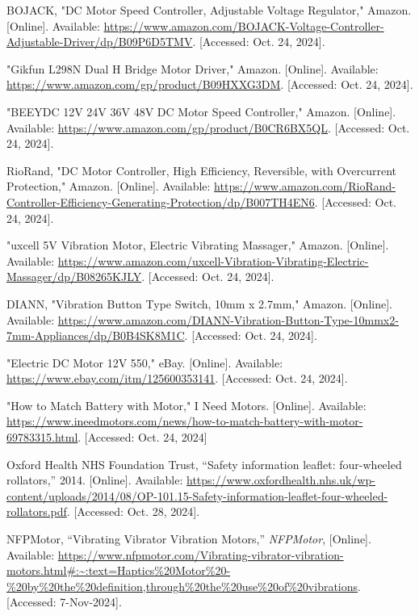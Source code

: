 \begin{thebibliography}{45}
	BOJACK, "DC Motor Speed Controller, Adjustable Voltage Regulator," Amazon. [Online]. Available: \url{https://www.amazon.com/BOJACK-Voltage-Controller-Adjustable-Driver/dp/B09P6D5TMV}. [Accessed: Oct. 24, 2024]. 
	
	"Gikfun L298N Dual H Bridge Motor Driver," Amazon. [Online]. Available: \url{https://www.amazon.com/gp/product/B09HXXG3DM}. [Accessed: Oct. 24, 2024]. 
	
	"BEEYDC 12V 24V 36V 48V DC Motor Speed Controller," Amazon. [Online]. Available: \url{https://www.amazon.com/gp/product/B0CR6BX5QL}. [Accessed: Oct. 24, 2024]. 
	
	RioRand, "DC Motor Controller, High Efficiency, Reversible, with Overcurrent Protection," Amazon. [Online]. Available: \url{https://www.amazon.com/RioRand-Controller-Efficiency-Generating-Protection/dp/B007TH4EN6}. [Accessed: Oct. 24, 2024]. 
	
	"uxcell 5V Vibration Motor, Electric Vibrating Massager," Amazon. [Online]. Available: \url{https://www.amazon.com/uxcell-Vibration-Vibrating-Electric-Massager/dp/B08265KJLY}. [Accessed: Oct. 24, 2024]. 
	
	DIANN, "Vibration Button Type Switch, 10mm x 2.7mm," Amazon. [Online]. Available: \url{https://www.amazon.com/DIANN-Vibration-Button-Type-10mmx2-7mm-Appliances/dp/B0B4SK8M1C}. [Accessed: Oct. 24, 2024]. 
	
	"Electric DC Motor 12V 550," eBay. [Online]. Available: \url{https://www.ebay.com/itm/125600353141}. [Accessed: Oct. 24, 2024]. 
	
	"How to Match Battery with Motor," I Need Motors. [Online]. Available: \url{https://www.ineedmotors.com/news/how-to-match-battery-with-motor-69783315.html}. [Accessed: Oct. 24, 2024]
	
	Oxford Health NHS Foundation Trust, ``Safety information leaflet: four-wheeled rollators,'' 2014. [Online]. Available: \url{https://www.oxfordhealth.nhs.uk/wp-content/uploads/2014/08/OP-101.15-Safety-information-leaflet-four-wheeled-rollators.pdf}. [Accessed: Oct. 28, 2024].
		 
	NFPMotor, ``Vibrating Vibrator Vibration Motors,'' \textit{NFPMotor}, [Online]. Available: \url{https://www.nfpmotor.com/Vibrating-vibrator-vibration-motors.html#:~:text=Haptics%20Motor%20-%20by%20the%20definition,through%20the%20use%20of%20vibrations}. [Accessed: 7-Nov-2024].
	

\end{thebibliography}
